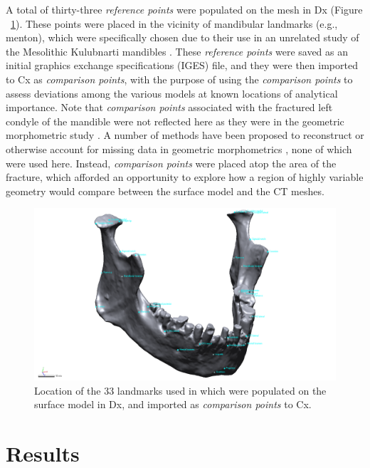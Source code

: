 \documentclass[review]{elsarticle}
\begin{document}
A total of thirty-three \textit{reference points} were populated on the mesh in Dx (Figure ~\ref{fig:Fig4}). These points were placed in the vicinity of mandibular landmarks (e.g., menton), which were specifically chosen due to their use in an unrelated study of the Mesolithic Kulubnarti mandibles \citep{RN11477}. These \textit{reference points} were saved as an initial graphics exchange specifications (IGES) file, and they were then imported to Cx as \textit{comparison points}, with the purpose of using the \textit{comparison points} to assess deviations among the various models at known locations of analytical importance. Note that \textit{comparison points} associated with the fractured left condyle of the mandible were not reflected here as they were in the geometric morphometric study \citep{RN11477}. A number of methods have been proposed to reconstruct \citep{RN11496,RN11501} or otherwise account for missing data in geometric morphometrics \citep{RN11500,RN11497,RN11498,RN11499,RN5928}, none of which were used here. Instead, \textit{comparison points} were placed atop the area of the fracture, which afforded an opportunity to explore how a region of highly variable geometry would compare between the surface model and the CT meshes.

\begin{figure}[ht]\centering
\includegraphics[width=\linewidth]{Fig4}
\caption{Location of the 33 landmarks used in \citet[Supplementary Information]{RN11477} which were populated on the surface model in Dx, and imported as \textit{comparison points} to Cx.}
\label{fig:Fig4}
\end{figure}

\section*{Results}
\end{document}
